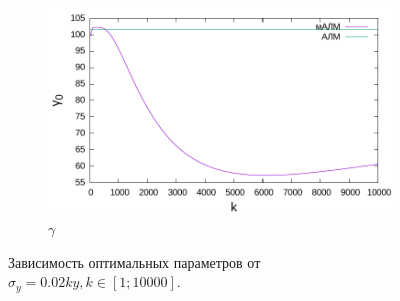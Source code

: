 \documentclass[11pt,a4paper]{article}
\begin{document}
\begin{figure}[h]
  \begin{subfigure}[b]{0.7\textwidth}
    \includegraphics[width=\textwidth]{figs/levmar/convergence/convergence_10000.txt_gamma.pdf}
    \caption{$\gamma$}
  \end{subfigure}
  \caption{Зависимость оптимальных параметров от $\sigma_y = 0.02ky, k \in [1; 10000]$.}
  \label{fig:conv_10000_g}
\end{figure}

\FloatBarrier


%
%

\end{document}
